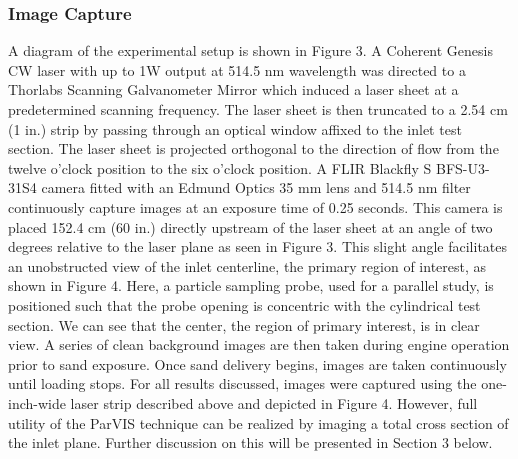 \documentclass[12pt]{iopart}
\begin{document}
\subsubsection{Image Capture}
A diagram of the experimental setup is shown in Figure 3.  A Coherent Genesis CW laser with up to 1W output at 514.5 nm wavelength was directed to a Thorlabs Scanning Galvanometer Mirror which induced a laser sheet at a predetermined scanning frequency. The laser sheet is then truncated to a 2.54 cm (1 in.) strip by passing through an optical window affixed to the inlet test section. The laser sheet is projected orthogonal to the direction of flow from the twelve o’clock position to the six o’clock position. A FLIR Blackfly S BFS-U3-31S4 camera fitted with an Edmund Optics 35 mm lens and 514.5 nm filter continuously capture images at an exposure time of 0.25 seconds. This camera is placed 152.4 cm (60 in.) directly upstream of the laser sheet at an angle of two degrees relative to the laser plane as seen in Figure 3. This slight angle facilitates an unobstructed view of the inlet centerline, the primary region of interest, as shown in Figure 4. Here, a particle sampling probe, used for a parallel study, is positioned such that the probe opening is concentric with the cylindrical test section. We can see that the center, the region of primary interest, is in clear view. A series of clean background images are then taken during engine operation prior to sand exposure. Once sand delivery begins, images are taken continuously until loading stops. 
For all results discussed, images were captured using the one-inch-wide laser strip described above and depicted in Figure 4. However, full utility of the ParVIS technique can be realized by imaging a total cross section of the inlet plane. Further discussion on this will be presented in Section 3 below. 
\end{document}
